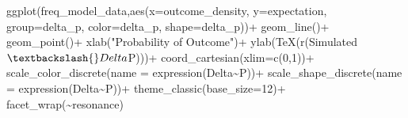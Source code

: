 \documentclass[
  english,
  man,floatsintext]{apa6}
\newenvironment{Shaded}{\begin{snugshade}}{\end{snugshade}}
\newcommand{\DecValTok}[1]{\textcolor[rgb]{0.00,0.00,0.81}{#1}}
\newcommand{\SpecialCharTok}[1]{\textcolor[rgb]{0.00,0.00,0.00}{#1}}
\newcommand{\StringTok}[1]{\textcolor[rgb]{0.31,0.60,0.02}{#1}}
\newcommand{\FunctionTok}[1]{\textcolor[rgb]{0.00,0.00,0.00}{#1}}
\newcommand{\AttributeTok}[1]{\textcolor[rgb]{0.77,0.63,0.00}{#1}}
\newcommand{\NormalTok}[1]{#1}
\begin{document}
\begin{appendix}
\begin{Shaded}
\begin{Highlighting}[]
\FunctionTok{ggplot}\NormalTok{(freq\_model\_data,}\FunctionTok{aes}\NormalTok{(}\AttributeTok{x=}\NormalTok{outcome\_density,}
\AttributeTok{y=}\NormalTok{expectation,}
\AttributeTok{group=}\NormalTok{delta\_p,}
\AttributeTok{color=}\NormalTok{delta\_p,}
\AttributeTok{shape=}\NormalTok{delta\_p))}\SpecialCharTok{+}
\FunctionTok{geom\_line}\NormalTok{()}\SpecialCharTok{+}
\FunctionTok{geom\_point}\NormalTok{()}\SpecialCharTok{+}
\FunctionTok{xlab}\NormalTok{(}\StringTok{"Probability of Outcome"}\NormalTok{)}\SpecialCharTok{+}
\FunctionTok{ylab}\NormalTok{(}\FunctionTok{TeX}\NormalTok{(r}\StringTok{\textquotesingle{}(Simulated $\textbackslash{}Delta$P)\textquotesingle{}}\NormalTok{))}\SpecialCharTok{+}
\FunctionTok{coord\_cartesian}\NormalTok{(}\AttributeTok{xlim=}\FunctionTok{c}\NormalTok{(}\DecValTok{0}\NormalTok{,}\DecValTok{1}\NormalTok{))}\SpecialCharTok{+}
\FunctionTok{scale\_color\_discrete}\NormalTok{(}\AttributeTok{name =} \FunctionTok{expression}\NormalTok{(Delta}\SpecialCharTok{\textasciitilde{}}\NormalTok{P))}\SpecialCharTok{+}
\FunctionTok{scale\_shape\_discrete}\NormalTok{(}\AttributeTok{name =} \FunctionTok{expression}\NormalTok{(Delta}\SpecialCharTok{\textasciitilde{}}\NormalTok{P))}\SpecialCharTok{+}
\FunctionTok{theme\_classic}\NormalTok{(}\AttributeTok{base\_size=}\DecValTok{12}\NormalTok{)}\SpecialCharTok{+}
\FunctionTok{facet\_wrap}\NormalTok{(}\SpecialCharTok{\textasciitilde{}}\NormalTok{resonance)}
\end{Highlighting}
\end{Shaded}
\end{appendix}
\end{document}
